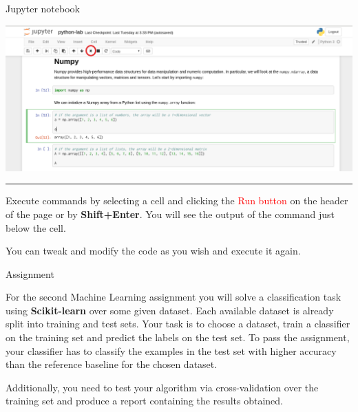 \documentclass{beamer}
\begin{document}
\begin{frame}{Jupyter notebook}
\centering

\includegraphics[width=\textwidth]{figures/click1}

\vspace{0.1in}
\hrule
\vspace{0.1in}

Execute commands by selecting a cell and clicking the \textcolor{red}{Run
button} on the header of the page or by \textbf{Shift+Enter}. You will see the
output of the command just below the cell.

You can tweak and modify the code as you wish and execute it again.

\end{frame}


\begin{frame}{Assignment}
\centering

For the second Machine Learning assignment you will solve a classification task
using \textbf{Scikit-learn} over some given dataset. Each available dataset is
already split into training and test sets. Your task is to
choose a dataset, train a classifier on the training set and predict the labels
on the test set. To pass the assignment, your classifier has to classify the
examples in the test set with higher accuracy than the reference baseline for
the chosen dataset.

Additionally, you need to test your algorithm via cross-validation over the
training set and produce a report containing the results obtained.

\end{frame}

\end{document}
